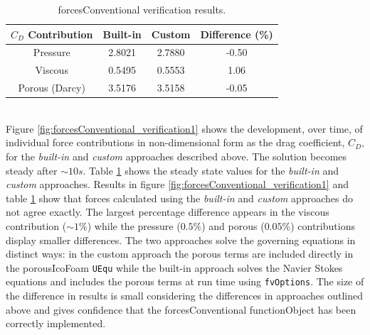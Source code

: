 \documentclass[a4paper,11pt]{report}
\begin{document}
\begin{table}[ht]
\centering
\begin{tabular}{ c | c | c | c }
    $C_D$ Contribution & Built-in & Custom & Difference (\%) \\
    \hline\hline
    Pressure & 2.8021 & 2.7880 & -0.50\\
    \hline
    Viscous & 0.5495 & 0.5553 & 1.06\\
    \hline
    Porous (Darcy) & 3.5176 & 3.5158 & -0.05\\
\end{tabular}
\caption{forcesConventional verification results.}
\label{table:forcesConventional_verification1}
\end{table}\\
Figure \ref{fig:forcesConventional_verification1} shows the development, over time, of individual force contributions in non-dimensional form as the drag coefficient, $C_D$, for the \emph{built-in} and \emph{custom} approaches described above. The solution becomes steady after $\sim10s$. Table \ref{table:forcesConventional_verification1} shows the steady state values for the \emph{built-in} and \emph{custom} approaches. Results in figure \ref{fig:forcesConventional_verification1} and table \ref{table:forcesConventional_verification1} show that forces calculated using the \emph{built-in} and \emph{custom} approaches do not agree exactly. The largest percentage difference appears in the viscous contribution ($\sim 1\%$) while the pressure ($0.5\%$) and porous ($0.05\%$) contributions display smaller differences. The two approaches solve the governing equations in distinct ways: in the custom approach the porous terms are included directly in the porousIcoFoam \texttt{UEqu} while the built-in approach solves the Navier Stokes equations and includes the porous terms at run time using \texttt{fvOptions}. The size of the difference in results is small considering the differences in approaches outlined above and gives confidence that the forcesConventional functionObject has been correctly implemented.



\end{document}

